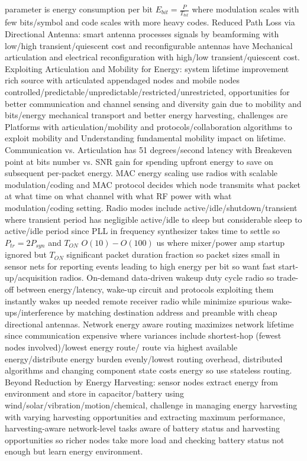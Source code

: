 \documentclass[9pt]{extarticle}
\begin{document}
\begin{multicols}{2}
parameter is energy consumption per bit $E_{bit}=\frac{P}{T_{bit}}$ where modulation scales with few bits/symbol and code scales with more heavy codes. Reduced Path Loss via Directional Antenna: smart antenna processes signals by beamforming with low/high transient/quiescent cost and reconfigurable antennas have Mechanical articulation and electrical reconfiguration with high/low transient/quiescent cost. Exploiting Articulation and Mobility for Energy: system lifetime improvement rich source with articulated appendaged nodes and mobile nodes controlled/predictable/unpredictable/restricted/unrestricted, opportunities for better communication and channel sensing and diversity gain due to mobility and bits/energy mechanical transport and better energy harvesting, challenges are  Platforms with articulation/mobility and protocols/collaboration algorithms to exploit mobility and Understanding fundamental mobility impact on lifetime. Communication vs. Articulation has 51 degrees/second latency with Breakeven point at bits number vs. SNR gain for spending upfront energy to save on subsequent per-packet energy. MAC energy scaling use radios with scalable modulation/coding and MAC protocol decides which node transmits what packet at what time on what channel with what RF power with what modulation/coding setting. Radio modes include active/idle/shutdown/transient where transient period has negligible active/idle to sleep but considerable sleep to active/idle period since PLL in frequency synthesizer takes time to settle so $P_{tr} = 2P_{syn}$ and $T_{ON}$ $O(10)-O(100)$ us where mixer/power amp startup ignored but $T_{ON}$  significant packet duration fraction so packet sizes small in sensor nets for reporting events leading to high energy per bit so want fast start-up/acquisition radios. On-demand data-driven wakeup duty cycle radio so trade-off between energy/latency, wake-up circuit and protocols exploiting them instantly wakes up needed remote receiver radio while minimize spurious wake-ups/interference by matching destination address and preamble with cheap directional antennas. Network energy aware routing maximizes network lifetime since communication expensive where variances include shortest-hop (fewest nodes involved)/lowest energy route/ route via highest available energy/distribute energy burden evenly/lowest routing overhead, distributed algorithms and changing component state costs energy so use stateless routing. Beyond Reduction by Energy Harvesting: sensor nodes extract energy from environment and store in capacitor/battery using wind/solar/vibration/motion/chemical, challenge in managing energy harvesting with varying harvesting opportunities and extracting maximum performance, harvesting-aware network-level tasks aware of battery status and harvesting opportunities so richer nodes take more load and checking battery status not enough but learn energy environment.


\end{multicols}
\end{document}
